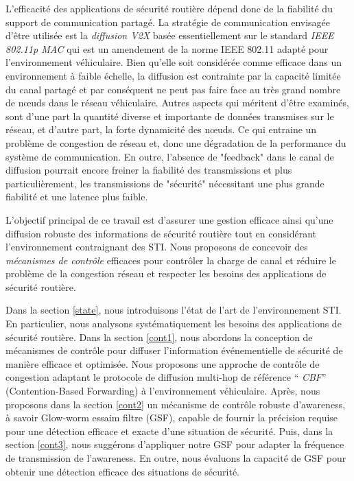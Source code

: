 L'efficacité des applications de sécurité routière dépend donc de la fiabilité du support de communication partagé. La stratégie de communication envisagée d'être utilisée est la \textit{diffusion V2X} basée essentiellement sur le standard \textit{IEEE 802.11p MAC} \cite{802.11p} qui est un amendement de la norme IEEE 802.11 adapté pour l'environnement véhiculaire. Bien qu'elle soit considérée comme efficace dans un environnement à faible échelle, la diffusion est contrainte par la capacité limitée du canal partagé et par conséquent ne peut pas faire face au très grand nombre de nœuds dans le réseau véhiculaire.
Autres aspects qui méritent d'être examinés, sont d'une part la quantité diverse et importante de données transmises sur le réseau, et d'autre part, la forte dynamicité des nœuds. Ce qui entraine un problème de congestion de réseau et, donc une dégradation de la performance du système de communication.
En outre, l'absence de "feedback" dans le canal de diffusion pourrait encore freiner la fiabilité des transmissions et plus particulièrement, les transmissions de "sécurité" nécessitant une plus grande fiabilité et une latence plus faible.

L'objectif principal de ce travail est d'assurer une gestion efficace ainsi qu'une diffusion robuste des informations de sécurité routière tout en considérant l'environnement contraignant des STI. Nous proposons de concevoir des \textit{mécanismes de contrôle} efficaces pour contrôler la charge de canal et réduire le problème de la congestion réseau et respecter les besoins des applications de sécurité routière.

Dans la section \ref{state}, nous introduisons l'état de l'art de l'environnement STI. En particulier, nous analysons systématiquement les besoins des applications de sécurité routière. Dans la section \ref{cont1}, nous abordons la conception de mécanismes de contrôle pour diffuser l'information événementielle de sécurité de manière efficace et optimisée. Nous proposons une approche de contrôle de congestion adaptant le protocole de diffusion multi-hop de référence `` \textit{CBF}'' (Contention-Based Forwarding) à  l'environnement véhiculaire. Après, nous proposons dans la section \ref{cont2} un mécanisme de contrôle robuste d'awareness, à savoir Glow-worm essaim filtre (GSF), capable de fournir la précision requise pour une détection efficace et exacte d'une situation de sécurité. Puis, dans la section \ref{cont3}, nous suggérons d'appliquer notre GSF pour adapter la fréquence de transmission de l'awareness. En outre, nous évaluons la capacité de GSF pour obtenir une détection efficace des situations de sécurité.

